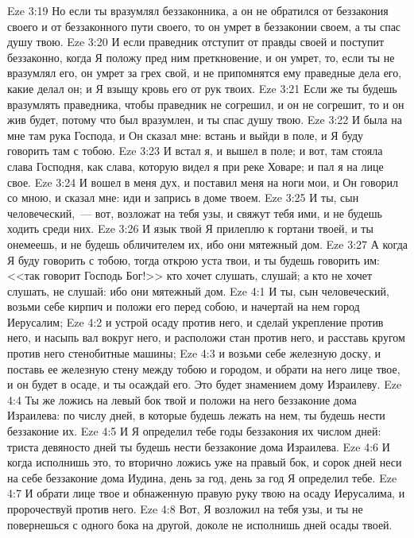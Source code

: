 \vs Eze 3:19 Но если ты вразумлял беззаконника, а он не обратился от беззакония своего и от беззаконного пути своего, то он умрет в беззаконии своем, а ты спас душу твою.
\vs Eze 3:20 И если праведник отступит от правды своей и поступит беззаконно, когда Я положу пред ним преткновение, и он умрет, то, если ты не вразумлял его, он умрет за грех свой, и не припомнятся ему праведные дела его, какие делал он; и Я взыщу кровь его от рук твоих.
\vs Eze 3:21 Если же ты будешь вразумлять праведника, чтобы праведник не согрешил, и он не согрешит, то и он жив будет, потому что был вразумлен, и ты спас душу твою.
\rsbpar\vs Eze 3:22 И была на мне там рука Господа, и Он сказал мне: встань и выйди в поле, и Я буду говорить там с тобою.
\vs Eze 3:23 И встал я, и вышел в поле; и вот, там стояла слава Господня, как слава, которую видел я при реке Ховаре; и пал я на лице свое.
\vs Eze 3:24 И вошел в меня дух, и поставил меня на ноги мои, и Он говорил со мною, и сказал мне: иди и запрись в доме твоем.
\vs Eze 3:25 И ты, сын человеческий,~--- вот, возложат на тебя узы, и свяжут тебя ими, и не будешь ходить среди них.
\vs Eze 3:26 И язык твой Я прилеплю к гортани твоей, и ты онемеешь, и не будешь обличителем их, ибо они мятежный дом.
\vs Eze 3:27 А когда Я буду говорить с тобою, тогда открою уста твои, и ты будешь говорить им: <<так говорит Господь Бог!>> кто хочет слушать, слушай; а кто не хочет слушать, не слушай: ибо они мятежный дом.
\vs Eze 4:1 И ты, сын человеческий, возьми себе кирпич и положи его перед собою, и начертай на нем город Иерусалим;
\vs Eze 4:2 и устрой осаду против него, и сделай укрепление против него, и насыпь вал вокруг него, и расположи стан против него, и расставь кругом против него стенобитные машины;
\vs Eze 4:3 и возьми себе железную доску, и поставь ее  железную стену между тобою и городом, и обрати на него лице твое, и он будет в осаде, и ты осаждай его. Это будет знамением дому Израилеву.
\vs Eze 4:4 Ты же ложись на левый бок твой и положи на него беззаконие дома Израилева: по числу дней, в которые будешь лежать на нем, ты будешь нести беззаконие их.
\vs Eze 4:5 И Я определил тебе годы беззакония их числом дней: триста девяносто дней ты будешь нести беззаконие дома Израилева.
\vs Eze 4:6 И когда исполнишь это, то вторично ложись уже на правый бок, и сорок дней неси на себе беззаконие дома Иудина, день за год, день за год Я определил тебе.
\vs Eze 4:7 И обрати лице твое и обнаженную правую руку твою на осаду Иерусалима, и пророчествуй против него.
\vs Eze 4:8 Вот, Я возложил на тебя узы, и ты не повернешься с одного бока на другой, доколе не исполнишь дней осады твоей.
